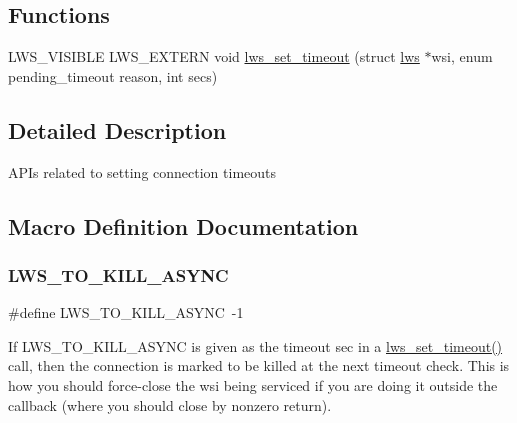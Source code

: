 \subsection*{Functions}
\begin{DoxyCompactItemize}
\item 
L\+W\+S\+\_\+\+V\+I\+S\+I\+B\+LE L\+W\+S\+\_\+\+E\+X\+T\+E\+RN void \hyperlink{group__timeout_gaced9f9237f6172fed9f730a2af51345a}{lws\+\_\+set\+\_\+timeout} (struct \hyperlink{structlws}{lws} $\ast$wsi, enum pending\+\_\+timeout reason, int secs)
\end{DoxyCompactItemize}


\subsection{Detailed Description}
A\+P\+Is related to setting connection timeouts 

\subsection{Macro Definition Documentation}
\mbox{\label{group__timeout_ga6a53a9a771c08417ffe75c953b58f015}} 
\subsubsection{\texorpdfstring{L\+W\+S\+\_\+\+T\+O\+\_\+\+K\+I\+L\+L\+\_\+\+A\+S\+Y\+NC}{LWS\_TO\_KILL\_ASYNC}\hspace{0.1cm}{\footnotesize\ttfamily [1/6]}}
{\footnotesize\ttfamily \#define L\+W\+S\+\_\+\+T\+O\+\_\+\+K\+I\+L\+L\+\_\+\+A\+S\+Y\+NC~-\/1}

If L\+W\+S\+\_\+\+T\+O\+\_\+\+K\+I\+L\+L\+\_\+\+A\+S\+Y\+NC is given as the timeout sec in a \hyperlink{group__timeout_gaced9f9237f6172fed9f730a2af51345a}{lws\+\_\+set\+\_\+timeout()} call, then the connection is marked to be killed at the next timeout check. This is how you should force-\/close the wsi being serviced if you are doing it outside the callback (where you should close by nonzero return). \mbox{\label{group__timeout_ga6a53a9a771c08417ffe75c953b58f015}} 
